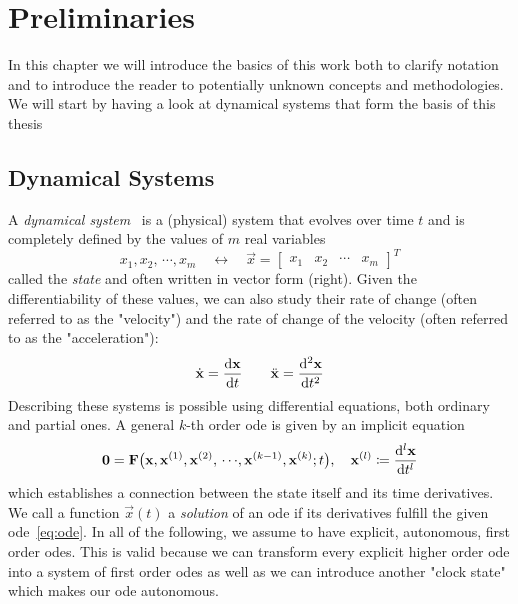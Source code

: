 \chapter{Preliminaries}
\label{c:preliminaries}



In this chapter we will introduce the basics of this work both to clarify notation and to introduce the reader to potentially unknown concepts and methodologies. We will start by having a look at dynamical systems that form the basis of this thesis

\section{Dynamical Systems}
	A \emph{dynamical system}~\cite{birkhoffDynamicalSystems1927} is a (physical) system that evolves over time \(t\) and is completely defined by the values of \(m\) real variables
	\begin{equation*}
		x_1, x_2, \,\cdots\!, x_m \quad\longleftrightarrow\quad \vec{x} = \begin{bmatrix} x_1 & x_2 & \cdots & x_m \end{bmatrix}^T
	\end{equation*}
	called the \emph{state} and often written in vector form (right). Given the differentiability of these values, we can also study their rate of change (often referred to as the "velocity") and the rate of change of the velocity (often referred to as the "acceleration"):
	\begin{equation*}
		\dot{\boldsymbol{\mathrm{x}}} = \dv{\boldsymbol{\mathrm{x}}}{t} \qquad \ddot{\boldsymbol{\mathrm{x}}} = \dv[2]{\boldsymbol{\mathrm{x}}}{t}
	\end{equation*}
	Describing these systems is possible using differential equations, both ordinary and partial ones. A general \(k\)-th order \ac{ode} is given by an implicit equation
	\begin{equation}
		\boldsymbol{\mathrm{0}} = \boldsymbol{\mathrm{F}}\big( \boldsymbol{\mathrm{x}}, \boldsymbol{\mathrm{x}}^{(1)}, \boldsymbol{\mathrm{x}}^{(2)}, \,\cdots\!, \boldsymbol{\mathrm{x}}^{(k - 1)}, \boldsymbol{\mathrm{x}}^{(k)}; t \big),\quad \boldsymbol{\mathrm{x}}^{(l)} \coloneqq \dv[l]{\boldsymbol{\mathrm{x}}}{t}  \label{eq:ode}
	\end{equation}
	which establishes a connection between the state itself and its time derivatives. We call a function \( \vec{x}(t) \) a \emph{solution} of an \ac{ode} if its derivatives fulfill the given \ac{ode}~\eqref{eq:ode}. In all of the following, we assume to have explicit, autonomous, first order \acp{ode}. This is valid because we can transform every explicit higher order \ac{ode} into a system of first order \acp{ode} as well as we can introduce another "clock state" which makes our \ac{ode} autonomous.

